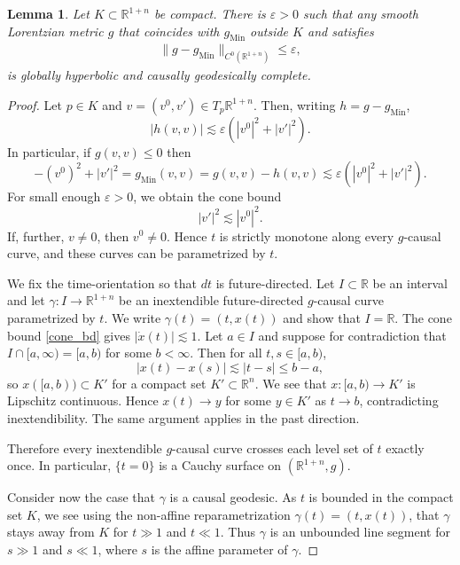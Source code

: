 \documentclass[11pt,letterpaper]{amsart}
\newtheorem{Lemma}[Theorem]{Lemma}
\theoremstyle{definition}
\numberwithin{equation}{section}
\newcommand{\norm}[1]{\lVert #1 \rVert}         %
\newcommand{\eps}{\varepsilon}
\newcommand{\gm}{g_{\mathrm{Min}}}
\def\R{\mathbb R}
\begin{document}
\begin{Lemma}\label{lem_globhyp_near_Min}
Let $K \subset \R^{1+n}$ be compact. There is $\eps > 0$ such that any smooth Lorentzian metric $g$ that coincides with $\gm$ outside $K$ and satisfies
\begin{gather*}
\norm{g-\gm}_{C^0(\R^{1+n})} \leq \eps,
\end{gather*}
is globally hyperbolic and causally geodesically complete.
\end{Lemma}
\begin{proof}
Let $p \in K$ and $v = (v^0, v') \in T_p\R^{1 + n}$.
Then, writing $h = g-\gm$,
\[
|h(v,v)| \lesssim \eps (|v^0|^2 + |v'|^2).
\]
In particular, if $g(v,v) \leq 0$ then
\[
-(v^0)^2 + |v'|^2 = \gm(v,v) = g(v,v) - h(v,v) \lesssim \eps (|v^0|^2 + |v'|^2).
\]
For small enough $\eps > 0$, we obtain the cone bound 
\begin{equation}\label{cone_bd}
|v'|^2 \lesssim |v^0|^2.
\end{equation}
If, further, $v \ne 0$, then $v^0 \ne 0$. Hence $t$ is strictly monotone along every $g$-causal curve, and these curves can be parametrized by $t$. 

We fix the time-orientation so that $dt$ is future-directed.
Let $I \subset \R$ be an interval and let $\gamma : I \to \R^{1+n}$ be an inextendible future-directed $g$-causal curve parametrized by $t$. We write $\gamma(t) = (t, x(t))$ and show that $I = \R$. 
The cone bound \eqref{cone_bd} gives $|\dot x(t)| \lesssim 1$.
Let $a \in I$ and suppose for contradiction that $I \cap [a, \infty) = [a, b)$ for some $b < \infty$. Then for all $t, s \in [a, b)$,
\[
|x(t) - x(s)| \lesssim |t - s| \le b - a,
\]
so $x([a, b)) \subset K'$ for a compact set $K' \subset \R^{n}$. 
We see that $x : [a, b) \to K'$ is Lipschitz continuous. Hence $x(t) \to y$ for some $y \in K'$ as $t \to b$, contradicting inextendibility. The same argument applies in the past direction.

Therefore every inextendible $g$-causal curve crosses each level set of $t$ exactly once. In particular, $\{t = 0\}$ is a Cauchy surface on $(\R^{1+n}, g)$.

Consider now the case that $\gamma$ is a causal geodesic. As $t$ is bounded in the compact set $K$, we see using the non-affine reparametrization $\gamma(t) = (t, x(t))$, that $\gamma$ stays away from $K$ for $t \gg 1$ and $t \ll 1$. Thus $\gamma$ is an unbounded line segment for $s \gg 1$ and $s \ll 1$, where $s$ is the affine parameter of $\gamma$.
\end{proof}
\end{document}
